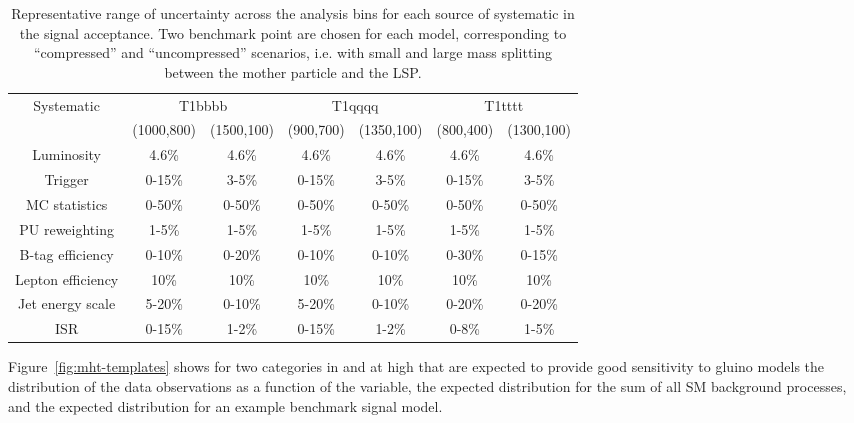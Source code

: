 \begin{table}[h!]
  \caption{Representative range of uncertainty across the analysis bins 
    for each source of systematic in the signal acceptance. 
    Two benchmark point are chosen for each model, 
    corresponding to ``compressed'' and ``uncompressed'' scenarios, 
    i.e. with small and large mass splitting between the mother particle and the LSP.
  }
  \label{tab:signal_systs}
  \centering
  \begin{tabular}{ ccccccc }
    \hline
    \hline
    Systematic & \multicolumn{2}{c}{T1bbbb} & \multicolumn{2}{c}{T1qqqq} & \multicolumn{2}{c}{T1tttt}  \\ 
                      & (1000,800) & (1500,100) & (900,700) & (1350,100) & (800,400) & (1300,100) \\
    \hline
    Luminosity        & 4.6\%      & 4.6\%      & 4.6\%     & 4.6\%   & 4.6\%      & 4.6\%     \\ \hline
    Trigger           & 0-15\%     & 3-5\%      & 0-15\%    & 3-5\%   & 0-15\%     & 3-5\%     \\ \hline
    MC statistics     & 0-50\%     & 0-50\%     & 0-50\%    & 0-50\%  & 0-50\%     & 0-50\%    \\ \hline
    PU reweighting    & 1-5\%      & 1-5\%      & 1-5\%     & 1-5\%   & 1-5\%      & 1-5\%     \\ \hline
    B-tag efficiency  & 0-10\%     & 0-20\%     & 0-10\%    & 0-10\%  & 0-30\%     & 0-15\%    \\ \hline
    Lepton efficiency & 10\%       & 10\%       & 10\%      & 10\%    & 10\%       & 10\%      \\ \hline
    Jet energy scale  & 5-20\%     & 0-10\%     & 5-20\%    & 0-10\%  & 0-20\%     & 0-20\%    \\ \hline
    ISR               & 0-15\%     & 1-2\%      & 0-15\%    & 1-2\%   & 0-8\%     & 1-5\%     \\
    \hline
    \hline
  \end{tabular}
\end{table}

Figure~\ref{fig:mht-templates} shows for two categories in \njet and
\nb at high \scalht that are expected to provide good sensitivity to
gluino models the distribution of the data observations as a function
of the \mht variable, the expected distribution for the sum of all SM
background processes, and the expected distribution for an example
benchmark signal model.

